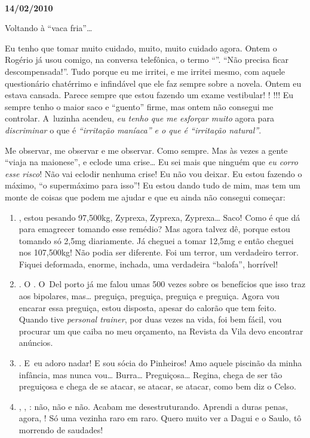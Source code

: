 \begin{center}\asterisc{}​\end{center}

\begin{flushright}\textbf{14/02/2010}\end{flushright}


Voltando à ``vaca fria''…

Eu tenho que tomar muito cuidado, muito, muito cuidado agora. Ontem o
Rogério já usou comigo, na conversa telefônica, o termo
``''. ``Não precisa ficar descompensada!''. Tudo porque eu
me irritei, e me irritei mesmo, com aquele questionário chatérrimo e
infindável que ele faz sempre sobre a novela. Ontem eu estava cansada.
Parece sempre que estou fazendo um exame vestibular! ! !!!
Eu sempre tenho o maior saco e ``guento'' firme, mas ontem não consegui
me controlar. A~luzinha acendeu, \emph{eu tenho que me esforçar muito}
agora para \emph{discriminar} o que é \emph{``irritação maníaca'' e o
que é ``irritação natural''}.

Me observar, me observar e me observar. Como sempre. Mas às vezes a
gente ``viaja na maionese'', e eclode uma crise… Eu sei mais que
ninguém que \emph{eu corro esse risco}! Não vai eclodir nenhuma crise!
Eu não vou deixar. Eu estou fazendo o máximo, ``o supermáximo para
isso''! Eu estou dando tudo de mim, mas tem um monte de coisas que podem
me ajudar e que eu ainda não consegui começar:

\begin{enumerate}
\item
  , estou pesando 97,500kg, Zyprexa, Zyprexa, Zyprexa…
  Saco! Como é que dá para emagrecer tomando esse remédio? Mas agora
  talvez dê, porque estou tomando só 2,5mg diariamente. Já cheguei a
  tomar 12,5mg e então cheguei nos 107,500kg! Não podia ser diferente.
  Foi um terror, um verdadeiro terror. Fiquei deformada, enorme,
  inchada, uma verdadeira ``balofa'', horrível!
\item
  .  O   . O~Del porto já me falou umas 500
  vezes sobre os benefícios que isso traz aos bipolares, mas…
  preguiça, preguiça, preguiça e preguiça. Agora vou encarar essa
  preguiça, estou disposta, apesar do calorão que tem feito. Quando tive
  \emph{personal trainer}, por duas vezes na vida, foi bem fácil, vou
  procurar um que caiba no meu orçamento, na Revista da Vila devo
  encontrar anúncios.
\item
  . E~eu adoro nadar! E sou sócia do Pinheiros! Amo aquele piscinão
  da minha infância, mas nunca vou… Burra…
  Preguiçosa… Regina, chega de ser tão preguiçosa e chega de se
  atacar, se atacar, se atacar, como bem diz o Celso.
\item
  , \emph{}, : não, não e não. Acabam me
  desestruturando. Aprendi a duras penas, agora, ! Só uma vezinha
  raro em raro. Quero muito ver a Dagui e o Saulo, tô morrendo de
  saudades!
\end{enumerate}

